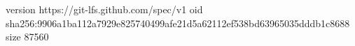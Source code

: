version https://git-lfs.github.com/spec/v1
oid sha256:9906a1ba112a7929e825740499afe21d5a62112ef538bd63965035dddb1c8688
size 87560
